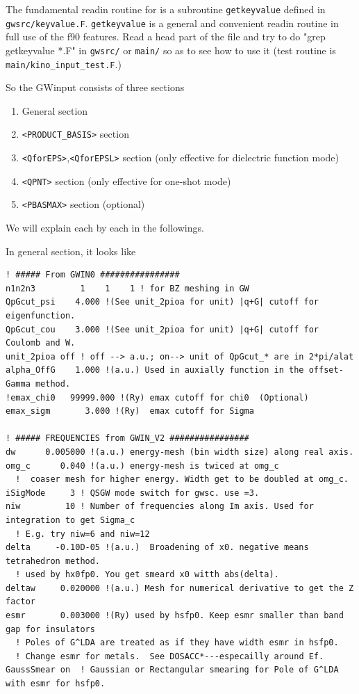 {The fundamental readin routine for \GWinput is a subroutine 
\verb#getkeyvalue# defined in \verb#gwsrc/keyvalue.F#.
\verb#getkeyvalue# is a general and convenient readin routine in full use of the f90 features.
Read a head part of the file and try to do "grep getkeyvalue *.F" 
in \verb#gwsrc/# or \verb#main/# so as to see how to use it
(test routine is \verb#main/kino_input_test.F#.)

So the {\sf GWinput} consists of three sections \\
\begin{enumerate}
 \item General section 
 \item \verb#<PRODUCT_BASIS># section
 \item \verb#<QforEPS>#,\verb#<QforEPSL># section (only effective for
dielectric function mode)
 \item \verb#<QPNT># section (only effective for one-shot mode)
 \item \verb#<PBASMAX># section (optional)
\end{enumerate}
We will explain each by each in the followings.

\newpage
{}
In general section, it looks like
\begin{verbatim}
! ##### From GWIN0 ################ 
n1n2n3         1    1    1 ! for BZ meshing in GW 
QpGcut_psi    4.000 !(See unit_2pioa for unit) |q+G| cutoff for eigenfunction.
QpGcut_cou    3.000 !(See unit_2pioa for unit) |q+G| cutoff for Coulomb and W.
unit_2pioa off ! off --> a.u.; on--> unit of QpGcut_* are in 2*pi/alat 
alpha_OffG    1.000 !(a.u.) Used in auxially function in the offset-Gamma method.
!emax_chi0   99999.000 !(Ry) emax cutoff for chi0  (Optional)
emax_sigm       3.000 !(Ry)  emax cutoff for Sigma

! ##### FREQUENCIES from GWIN_V2 ################ 
dw      0.005000 !(a.u.) energy-mesh (bin width size) along real axis.
omg_c      0.040 !(a.u.) energy-mesh is twiced at omg_c
  !  coaser mesh for higher energy. Width get to be doubled at omg_c.
iSigMode     3 ! QSGW mode switch for gwsc. use =3.
niw         10 ! Number of frequencies along Im axis. Used for integration to get Sigma_c
  ! E.g. try niw=6 and niw=12
delta     -0.10D-05 !(a.u.)  Broadening of x0. negative means tetrahedron method.
  ! used by hx0fp0. You get smeard x0 witth abs(delta).
deltaw     0.020000 !(a.u.) Mesh for numerical derivative to get the Z factor
esmr       0.003000 !(Ry) used by hsfp0. Keep esmr smaller than band gap for insulators
  ! Poles of G^LDA are treated as if they have width esmr in hsfp0. 
  ! Change esmr for metals.  See DOSACC*---especailly around Ef.
GaussSmear on  ! Gaussian or Rectangular smearing for Pole of G^LDA with esmr for hsfp0.
\end{verbatim}

}
